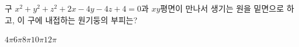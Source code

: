 구 $x^2+y^2+z^2+2x-4y-4z+4=0$과 $xy$평면이 만나서 생기는 원을 밑면으로 하고, 이 구에 내접하는 원기둥의 부피는?
\begin{choices32}{$4\pi$}{$6\pi$}{$8\pi$}{$10\pi$}{$12\pi$}\end{choices32}
